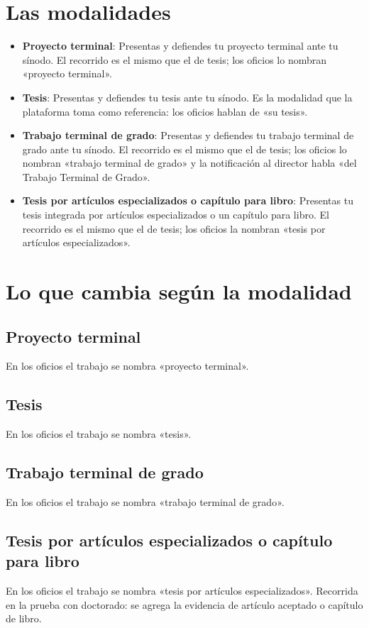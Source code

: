 \section{Las modalidades}
\begin{itemize}
  \item \textbf{Proyecto terminal}: Presentas y defiendes tu proyecto terminal ante tu sínodo. El recorrido es el mismo que el de tesis; los oficios lo nombran «proyecto terminal».
  \item \textbf{Tesis}: Presentas y defiendes tu tesis ante tu sínodo. Es la modalidad que la plataforma toma como referencia: los oficios hablan de «su tesis».
  \item \textbf{Trabajo terminal de grado}: Presentas y defiendes tu trabajo terminal de grado ante tu sínodo. El recorrido es el mismo que el de tesis; los oficios lo nombran «trabajo terminal de grado» y la notificación al director habla «del Trabajo Terminal de Grado».
  \item \textbf{Tesis por artículos especializados o capítulo para libro}: Presentas tu tesis integrada por artículos especializados o un capítulo para libro. El recorrido es el mismo que el de tesis; los oficios la nombran «tesis por artículos especializados».
\end{itemize}

\section{Lo que cambia según la modalidad}
\subsection{Proyecto terminal}
En los oficios el trabajo se nombra «proyecto terminal». 
\subsection{Tesis}
En los oficios el trabajo se nombra «tesis». 
\subsection{Trabajo terminal de grado}
En los oficios el trabajo se nombra «trabajo terminal de grado». 
\subsection{Tesis por artículos especializados o capítulo para libro}
En los oficios el trabajo se nombra «tesis por artículos especializados». Recorrida en la prueba con doctorado: se agrega la evidencia de artículo aceptado o capítulo de libro.
